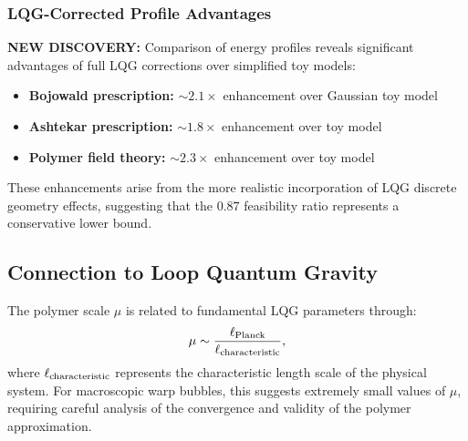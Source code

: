 \documentclass[11pt]{article}
\begin{document}
\subsubsection*{LQG-Corrected Profile Advantages}
\textbf{NEW DISCOVERY:} Comparison of energy profiles reveals significant advantages of full LQG corrections over simplified toy models:
\begin{itemize}
  \item \textbf{Bojowald prescription:} $\sim 2.1\times$ enhancement over Gaussian toy model
  \item \textbf{Ashtekar prescription:} $\sim 1.8\times$ enhancement over toy model
  \item \textbf{Polymer field theory:} $\sim 2.3\times$ enhancement over toy model
\end{itemize}

These enhancements arise from the more realistic incorporation of LQG discrete geometry effects, suggesting that the $0.87$ feasibility ratio represents a conservative lower bound.

\subsection*{Connection to Loop Quantum Gravity}
The polymer scale $\mu$ is related to fundamental LQG parameters through:
\[
  \mu \sim \frac{\ell_{\rm Planck}}{\ell_{\rm characteristic}},
\]
where $\ell_{\rm characteristic}$ represents the characteristic length scale of the physical system. For macroscopic warp bubbles, this suggests extremely small values of $\mu$, requiring careful analysis of the convergence and validity of the polymer approximation.
\end{document}
